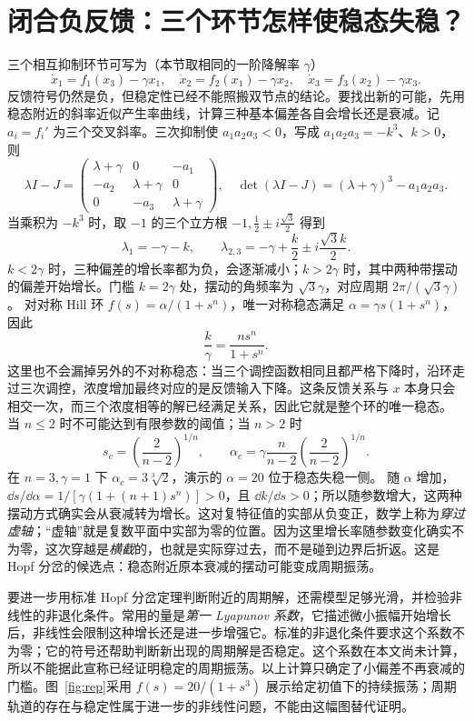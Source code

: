 \section{闭合负反馈：三个环节怎样使稳态失稳？}
三个相互抑制环节可写为（本节取相同的一阶降解率 $\gamma$）
\begin{equation}\dot x_1=f_1(x_3)-\gamma x_1,\quad\dot x_2=f_2(x_1)-\gamma x_2,\quad\dot x_3=f_3(x_2)-\gamma x_3.\end{equation}
反馈符号仍然是负，但稳定性已经不能照搬双节点的结论。要找出新的可能，先用稳态附近的斜率近似产生率曲线，计算三种基本偏差各自会增长还是衰减。记 $a_i=f_i'$ 为三个交叉斜率。三次抑制使 $a_1a_2a_3<0$，写成 $a_1a_2a_3=-k^3$、$k>0$，则
\[
\lambda I-J=\begin{pmatrix}\lambda+\gamma&0&-a_1\\-a_2&\lambda+\gamma&0\\0&-a_3&\lambda+\gamma\end{pmatrix},
\quad \det(\lambda I-J)=(\lambda+\gamma)^3-a_1a_2a_3.
\]
当乘积为 $-k^3$ 时，取 $-1$ 的三个立方根 $-1,\frac12\pm i\frac{\sqrt3}{2}$ 得到
\[
\lambda_1=-\gamma-k,\qquad\lambda_{2,3}=-\gamma+\frac k2\pm i\frac{\sqrt3k}{2}.
\]
$k<2\gamma$ 时，三种偏差的增长率都为负，会逐渐减小；$k>2\gamma$ 时，其中两种带摆动的偏差开始增长。门槛 $k=2\gamma$ 处，摆动的角频率为 $\sqrt3\gamma$，对应周期 $2\pi/(\sqrt3\gamma)$。
对对称 Hill 环 $f(s)=\alpha/(1+s^n)$，唯一对称稳态满足 $\alpha=\gamma s(1+s^n)$，因此
\[
\frac k\gamma=\frac{ns^n}{1+s^n}.
\]
这里也不会漏掉另外的不对称稳态：当三个调控函数相同且都严格下降时，沿环走过三次调控，浓度增加最终对应的是反馈输入下降。这条反馈关系与 $x$ 本身只会相交一次，而三个浓度相等的解已经满足关系，因此它就是整个环的唯一稳态。
当 $n\leq2$ 时不可能达到有限参数的阈值；当 $n>2$ 时
\[
s_c=\left(\frac2{n-2}\right)^{1/n},\qquad
\alpha_c=\gamma\frac n{n-2}\left(\frac2{n-2}\right)^{1/n}.
\]
在 $n=3,\gamma=1$ 下 $\alpha_c=3\sqrt[3]2$，演示的 $\alpha=20$ 位于稳态失稳一侧。
随 $\alpha$ 增加，$\dd s/\dd\alpha=1/[\gamma(1+(n+1)s^n)]>0$，且 $\dd k/\dd s>0$；所以随参数增大，这两种摆动方式确实会从衰减转为增长。这对复特征值的实部从负变正，数学上称为\emph{穿过虚轴}；“虚轴”就是复数平面中实部为零的位置。因为这里增长率随参数变化确实不为零，这次穿越是\emph{横截}的，也就是实际穿过去，而不是碰到边界后折返。这是 Hopf 分岔的候选点：稳态附近原本衰减的摆动可能变成周期振荡。

要进一步用标准 Hopf 分岔定理判断附近的周期解，还需模型足够光滑，并检验非线性的非退化条件。常用的量是\emph{第一 Lyapunov 系数}，它描述微小振幅开始增长后，非线性会限制这种增长还是进一步增强它。标准的非退化条件要求这个系数不为零；它的符号还帮助判断新出现的周期解是否稳定。这个系数在本文尚未计算，所以不能据此宣称已经证明稳定的周期振荡。以上计算只确定了小偏差不再衰减的门槛。图~\ref{fig:rep}采用 $f(s)=20/(1+s^3)$ 展示给定初值下的持续振荡；周期轨道的存在与稳定性属于进一步的非线性问题，不能由这幅图替代证明。


